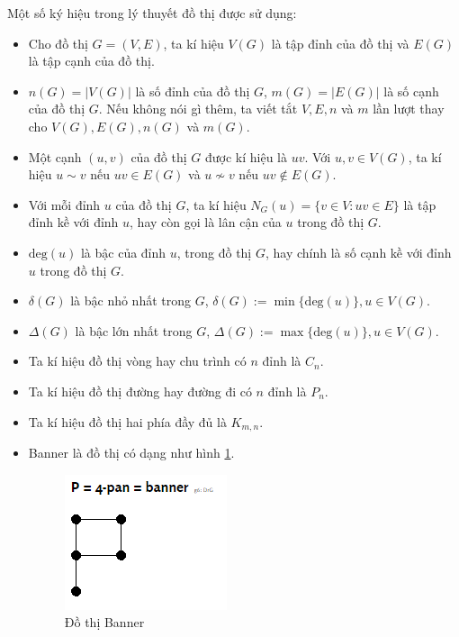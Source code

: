 \documentclass[14pt, oneside, a4paper, openany]{scrartcl}
\begin{document}
Một số ký hiệu trong lý thuyết đồ thị được sử dụng:
\begin{itemize}
	\item Cho đồ thị $G = (V,E)$, ta kí hiệu $V(G)$ là tập đỉnh của đồ thị và $E(G)$ là tập cạnh  của đồ thị.
	\item $n(G) = |V(G)|$ là số đỉnh của đồ thị $G$, $m(G) = |E(G)|$ là số cạnh của đồ thị $G$. Nếu không nói gì thêm, ta viết tắt $V, E, n$ và $m$ lần lượt thay cho $V(G), E(G), n(G)$ và $m(G)$.
	\item Một cạnh $(u,v)$ của đồ thị $G$ được kí hiệu là $uv$. Với $u,v \in V(G)$, ta kí hiệu $u \sim v$ nếu $uv \in E(G)$ và $u \nsim v$ nếu $uv \not\in E(G)$.
	\item Với mỗi đỉnh $u$ của đồ thị $G$, ta kí hiệu $N_G(u) = \{v \in V: uv \in E\}$ là tập đỉnh kề với đỉnh $u$, hay còn gọi là lân cận  của $u$ trong đồ thị $G$.
	\item $\textrm{deg}(u)$ là bậc của đỉnh  $u$, trong đồ thị $G$, hay chính là số cạnh kề với đỉnh $u$ trong đồ thị $G$.
	\item $\delta(G)$ là bậc nhỏ nhất  trong $G$, $\delta(G) := \min\{\textrm{deg}(u)\} , u \in V(G)$.
	\item $\Delta(G)$ là bậc lớn nhất  trong $G$, $\Delta(G) := \max\{\textrm{deg}(u)\} , u \in V(G)$.
	\item Ta kí hiệu đồ thị vòng  hay chu trình  có $n$ đỉnh là $C_n$.
	\item Ta kí hiệu đồ thị đường hay đường đi  có $n$ đỉnh là $P_n$.
	\item Ta kí hiệu đồ thị hai phía  đầy đủ là $K_{m,n}$.
	\item \cite{graphclasses} Banner là đồ thị có dạng như hình \ref{fig:banner}.
	\begin{figure}[!h]
		\centering
		\includegraphics[scale=1]{figures/banner.png} 
		\caption[Đồ thị Banner]{Đồ thị Banner}
		\label{fig:banner}
	\end{figure}
\end{itemize}
\end{document}
